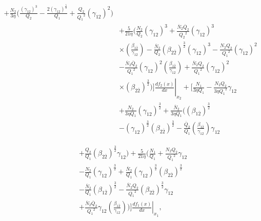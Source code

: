 \documentclass[final,3p,times,twocolumn]{elsarticle}
\begin{document}
\begin{equation*}
\begin{split}
+ \frac{N_2}{3 \eta} \Biggl( \frac{(\gamma_{12})^3}{Q_2}  - \frac{2(\gamma_{12})^\frac{5}{2}}{Q_1} + \frac{Q_2}{{Q_1}^2} (\gamma_{12})^2 \Biggr)  \\ & + \frac{5}{21 \eta} \Biggl(\frac{N_2}{Q_2} (\gamma_{12})^3 + \frac{\overline{N}_{2} \overline{Q}_{2}}{{Q_2}^2}(\gamma_{12})^3 \\ & \times \left(\frac{\beta_{1\overline{2}}}{\gamma_{12}}\right)  - \frac{\overline{N}_{2}}{Q_2} (\beta_{2\overline{2}})^\frac{3}{2} (\gamma_{12})^3    - \frac{N_2 Q_2}{{Q_1}^2} (\gamma_{12})^2 \\ & - \frac{\overline{N}_{2} \overline{Q}_{2}}{{Q_1}^2} (\gamma_{12})^2  \left(\frac{\beta_{1\overline{2}}}{\gamma_{12}}\right)  + \frac{\overline{N}_{2} Q_2}{{Q_1}^2} (\gamma_{12})^2 \\ & \times \left. (\beta_{2\overline{2}})^\frac{3}{2} \Biggr) \Biggr] \frac{df_2(x)}{dx} \right|_{x_2} + \Biggl[ \frac{N_1}{3 \eta Q_1} - \frac{N_2 Q_2}{3 \eta {Q_1}^2} \gamma_{12} \\ & + \frac{N_{2}}{3\eta Q_{1}} (\gamma_{12})^\frac{3}{2} + \frac{\overline{N}_{2}}{3 \eta Q_1} \Biggl( (\beta_{1\overline{2}})^\frac{3}{2} \\ & - (\gamma_{12})^\frac{3}{2} (\beta_{2\overline{2}})^\frac{3}{2} - \frac{\overline{Q}_{2}}{Q_1}  \left(\frac{\beta_{1\overline{2}}}{\gamma_{12}}\right) \gamma_{12}  
              \end{split}
              \end{equation*}
               
              \begin{equation}
              \begin{split}
              & +  \frac{Q_2}{Q_1} (\beta_{2\overline{2}})^\frac{3}{2} \gamma_{12} \Biggr)  + \frac{5}{21 \eta} \Biggl( \frac{N_1}{Q_1} + \frac{N_2 Q_2}{{Q_1}^2} \gamma_{12} \\ & - \frac{N_2}{Q_1} (\gamma_{12})^\frac{3}{2}   + \frac{\overline{N}_{2}}{Q_1} (\gamma_{12})^\frac{3}{2} (\beta_{2\overline{2}})^\frac{3}{2}  \\ & - \frac{\overline{N}_{2}}{Q_1} (\beta_{1\overline{2}})^\frac{3}{2} -  \frac{\overline{N}_{2} Q_2}{{Q_1}^2} (\beta_{2\overline{2}})^\frac{3}{2} \gamma_{12} \\ & + \frac{\overline{N}_{2} \overline{Q}_{2}}{{Q_1}^2} \gamma_{12}  \left(\frac{\beta_{1\overline{2}}}{\gamma_{12}}\right) \Biggr) \left. \Biggr] \frac{df_1(x)}{dx}\right|_{x_1},
             \label{eqn:k11_caseI}
            \end{split}
            \end{equation}
\end{document}
